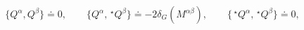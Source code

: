 \begin{equation*}
\{ Q^\alpha, Q^\beta \} \doteq 0,
\qquad
\{ Q^\alpha, \,^\star Q^\beta \} \doteq - 2 \delta_G(M^{\alpha\beta}),
\qquad
\{ \,^\star Q^\alpha, \,^\star Q^\beta \} \doteq 0,
\end{equation*}

